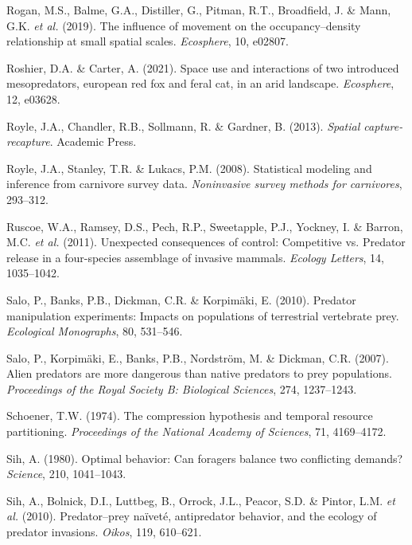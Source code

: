 \documentclass[11pt,a4paper,titlepage,twoside,openright]{style/unimelbthesis}
\begin{document}
\begin{mainmatter}
\leavevmode\hypertarget{ref-rogan2019influence}{}%
Rogan, M.S., Balme, G.A., Distiller, G., Pitman, R.T., Broadfield, J. \& Mann, G.K. \emph{et al.} (2019). The influence of movement on the occupancy--density relationship at small spatial scales. \emph{Ecosphere}, 10, e02807.

\leavevmode\hypertarget{ref-roshier2021space}{}%
Roshier, D.A. \& Carter, A. (2021). Space use and interactions of two introduced mesopredators, european red fox and feral cat, in an arid landscape. \emph{Ecosphere}, 12, e03628.

\leavevmode\hypertarget{ref-royle2013spatial}{}%
Royle, J.A., Chandler, R.B., Sollmann, R. \& Gardner, B. (2013). \emph{Spatial capture-recapture}. Academic Press.

\leavevmode\hypertarget{ref-royle2008statistical}{}%
Royle, J.A., Stanley, T.R. \& Lukacs, P.M. (2008). Statistical modeling and inference from carnivore survey data. \emph{Noninvasive survey methods for carnivores}, 293--312.

\leavevmode\hypertarget{ref-ruscoe2011unexpected}{}%
Ruscoe, W.A., Ramsey, D.S., Pech, R.P., Sweetapple, P.J., Yockney, I. \& Barron, M.C. \emph{et al.} (2011). Unexpected consequences of control: Competitive vs. Predator release in a four-species assemblage of invasive mammals. \emph{Ecology Letters}, 14, 1035--1042.

\leavevmode\hypertarget{ref-salo2010predator}{}%
Salo, P., Banks, P.B., Dickman, C.R. \& Korpimäki, E. (2010). Predator manipulation experiments: Impacts on populations of terrestrial vertebrate prey. \emph{Ecological Monographs}, 80, 531--546.

\leavevmode\hypertarget{ref-salo2007alien}{}%
Salo, P., Korpimäki, E., Banks, P.B., Nordström, M. \& Dickman, C.R. (2007). Alien predators are more dangerous than native predators to prey populations. \emph{Proceedings of the Royal Society B: Biological Sciences}, 274, 1237--1243.

\leavevmode\hypertarget{ref-schoener1974compression}{}%
Schoener, T.W. (1974). The compression hypothesis and temporal resource partitioning. \emph{Proceedings of the National Academy of Sciences}, 71, 4169--4172.

\leavevmode\hypertarget{ref-sih1980optimal}{}%
Sih, A. (1980). Optimal behavior: Can foragers balance two conflicting demands? \emph{Science}, 210, 1041--1043.

\leavevmode\hypertarget{ref-sih2010predator}{}%
Sih, A., Bolnick, D.I., Luttbeg, B., Orrock, J.L., Peacor, S.D. \& Pintor, L.M. \emph{et al.} (2010). Predator--prey naïveté, antipredator behavior, and the ecology of predator invasions. \emph{Oikos}, 119, 610--621.


\end{mainmatter}
\end{document}
